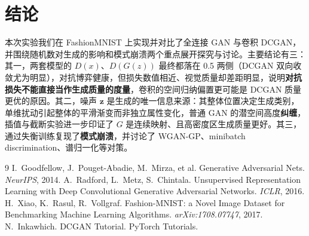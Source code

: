 \documentclass[a4paper]{article}
\begin{document}
\section{结论}
本次实验我们在 FashionMNIST 上实现并对比了全连接 GAN 与卷积 DCGAN，并围绕随机数对生成的影响和模式崩溃两个重点展开探究与讨论。主要结论有三：其一，两套模型的 $D(x)$、$D(G(z))$ 最终都落在 0.5 两侧（DCGAN 双向收敛尤为明显），对抗博弈健康，但损失数值相近、视觉质量却差距明显，说明\textbf{对抗损失不能直接当作生成质量的度量}，卷积的空间归纳偏置更可能是 DCGAN 质量更优的原因。其二，噪声 $\bm{z}$ 是生成的唯一信息来源：其整体位置决定生成类别，单维扰动引起整体的平滑渐变而非独立属性变化，普通 GAN 的潜空间高度\textbf{纠缠}，插值与截断实验进一步印证了 $G$ 是连续映射、且高密度区生成质量更好。其三，通过失衡训练复现了\textbf{模式崩溃}，并讨论了 WGAN-GP、minibatch discrimination、谱归一化等对策。

\begin{thebibliography}{9}
   I.~Goodfellow, J.~Pouget-Abadie, M.~Mirza, et al. Generative Adversarial Nets. \textit{NeurIPS}, 2014.
   A.~Radford, L.~Metz, S.~Chintala. Unsupervised Representation Learning with Deep Convolutional Generative Adversarial Networks. \textit{ICLR}, 2016.
   H.~Xiao, K.~Rasul, R.~Vollgraf. Fashion-MNIST: a Novel Image Dataset for Benchmarking Machine Learning Algorithms. \textit{arXiv:1708.07747}, 2017.
   N.~Inkawhich. DCGAN Tutorial. PyTorch Tutorials.
\end{thebibliography}
\end{document}
